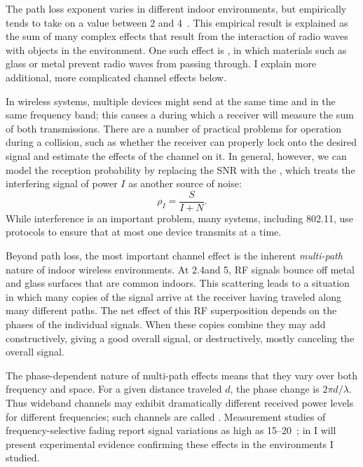 The path loss exponent varies in different indoor environments, but empirically tends to take on a value between 2 and 4~\cite{Sklar}. This empirical result is explained as the sum of many complex effects that result from the interaction of radio waves with objects in the environment. One such effect is , in which materials such as glass or metal prevent radio waves from passing through. I explain more additional, more complicated channel effects below.

In wireless systems, multiple devices might send at the same time and in the same frequency band; this  causes a  during which a receiver will measure the sum of both transmissions. There are a number of practical problems for operation during a collision, such as whether the receiver can properly lock onto the desired signal and estimate the effects of the channel on it. In general, however, we can model the reception probability by replacing the SNR with the , which treats the interfering signal of power $I$ as another source of noise:
\begin{equation}
\label{eq:sinr}
\rho_I = \frac{S}{I+N}.
\end{equation}
While interference is an important problem, many systems, including 802.11, use  protocols to ensure that at most one device transmits at a time.

Beyond path loss, the most important channel effect is the inherent \emph{multi-path} nature of indoor wireless environments. At 2.4\GHz and 5\GHz, RF signals bounce off metal and glass surfaces that are common indoors. This scattering leads to a situation in which many copies of the signal arrive at the receiver having traveled along many different paths. The net effect of this RF superposition depends on the phases of the individual signals. When these copies combine they may add constructively, giving a good overall signal, or destructively, mostly canceling the overall signal.

The phase-dependent nature of multi-path effects means that they vary over both frequency and space. For a given distance traveled $d$, the phase change is $2\pi d/\lambda$. Thus wideband channels may exhibit dramatically different received power levels for different frequencies; such channels are called . Measurement studies of frequency-selective fading report signal variations as high as 15--20\dB~\cite{Judd_CHARM}; in  I will present experimental evidence confirming these effects in the environments I studied.

